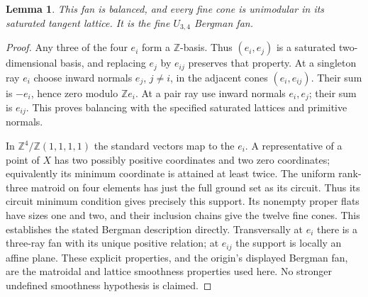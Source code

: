 \documentclass[11pt]{article}
\newtheorem{lemma}[theorem]{Lemma}
\newcommand{\Z}{\mathbb Z}
\begin{document}
\begin{lemma}\label{geometry}
This fan is balanced, and every fine cone is unimodular in its saturated tangent lattice. It is the fine $U_{3,4}$ Bergman fan.
\end{lemma}
\begin{proof}
Any three of the four $e_i$ form a $\Z$-basis. Thus $(e_i,e_j)$ is a saturated two-dimensional basis, and replacing $e_j$ by $e_{ij}$ preserves that property. At a singleton ray $e_i$ choose inward normals $e_j$, $j\ne i$, in the adjacent cones $(e_i,e_{ij})$. Their sum is $-e_i$, hence zero modulo $\Z e_i$. At a pair ray use inward normals $e_i,e_j$; their sum is $e_{ij}$. This proves balancing with the specified saturated lattices and primitive normals.

In $\Z^4/\Z(1,1,1,1)$ the standard vectors map to the $e_i$. A representative of a point of $X$ has two possibly positive coordinates and two zero coordinates; equivalently its minimum coordinate is attained at least twice. The uniform rank-three matroid on four elements has just the full ground set as its circuit. Thus its circuit minimum condition gives precisely this support. Its nonempty proper flats have sizes one and two, and their inclusion chains give the twelve fine cones. This establishes the stated Bergman description directly. Transversally at $e_i$ there is a three-ray fan with its unique positive relation; at $e_{ij}$ the support is locally an affine plane. These explicit properties, and the origin's displayed Bergman fan, are the matroidal and lattice smoothness properties used here. No stronger undefined smoothness hypothesis is claimed.
\end{proof}
\end{document}
